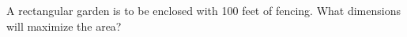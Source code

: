 \documentclass[preview]{standalone}
\begin{document}
\begin{center}
A rectangular garden is to be enclosed with 100 feet of fencing. What dimensions will maximize the area?
\end{center}
\end{document}
